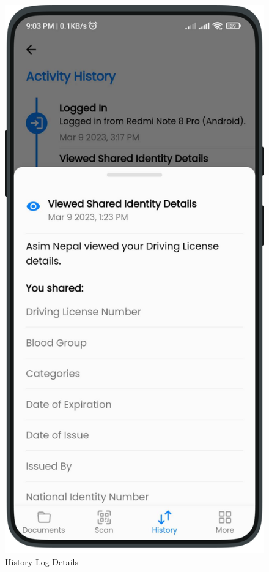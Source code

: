 \begin{multicols}{2}
            \begin{figure}[H]
            \centering
            \includegraphics[width=0.6\linewidth]{images/results/mobile/HistoryDetails.png}
            \caption[History Log Details]{History Log Details}
            \label{fig:HistoryDetails.png}
            \end{figure}
        \end{multicols}
        
